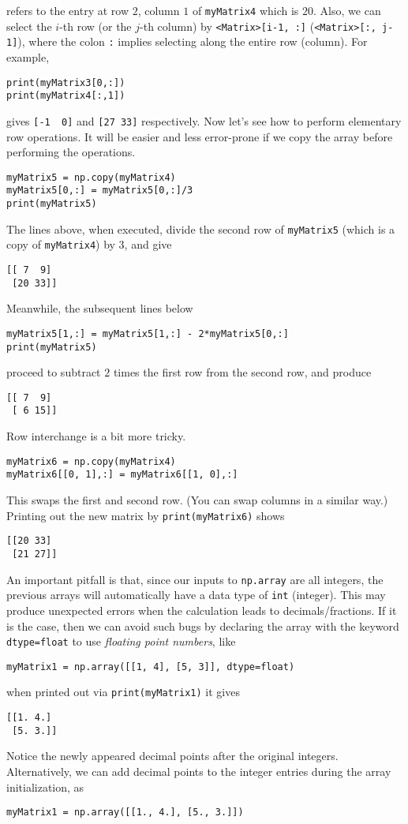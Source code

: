 refers to the entry at row $2$, column $1$ of \verb|myMatrix4| which is $20$. Also, we can select the $i$-th row (or the $j$-th column) by \verb|<Matrix>[i-1, :]| (\verb|<Matrix>[:, j-1]|), where the colon \verb|:| implies selecting along the entire row (column). For example,
\begin{lstlisting}
print(myMatrix3[0,:])
print(myMatrix4[:,1])
\end{lstlisting}
gives
\verb|[-1  0]| and \verb|[27 33]| respectively. Now let's see how to perform elementary row operations. It will be easier and less error-prone if we copy the array before performing the operations.
\begin{lstlisting}
myMatrix5 = np.copy(myMatrix4)
myMatrix5[0,:] = myMatrix5[0,:]/3
print(myMatrix5)
\end{lstlisting}
The lines above, when executed, divide the second row of \verb|myMatrix5| (which is a copy of \verb|myMatrix4|) by $3$, and give
\begin{lstlisting}
[[ 7  9]
 [20 33]]    
\end{lstlisting}
Meanwhile, the subsequent lines below
\begin{lstlisting}
myMatrix5[1,:] = myMatrix5[1,:] - 2*myMatrix5[0,:]
print(myMatrix5)
\end{lstlisting}
proceed to subtract $2$ times the first row from the second row, and produce
\begin{lstlisting}
[[ 7  9]
 [ 6 15]]
\end{lstlisting}
Row interchange is a bit more tricky.
\begin{lstlisting}
myMatrix6 = np.copy(myMatrix4)
myMatrix6[[0, 1],:] = myMatrix6[[1, 0],:]    
\end{lstlisting}
This swaps the first and second row. (You can swap columns in a similar way.) Printing out the new matrix by \verb|print(myMatrix6)| shows
\begin{lstlisting}
[[20 33]
 [21 27]]
\end{lstlisting}
An important pitfall is that, since our inputs to \texttt{np.array} are all integers, the previous arrays will automatically have a data type of \texttt{int} (integer). This may produce unexpected errors when the calculation leads to decimals/fractions. If it is the case, then we can avoid such bugs by declaring the array with the keyword \verb|dtype=float| to use \textit{floating point numbers}, like
\begin{lstlisting}
myMatrix1 = np.array([[1, 4], [5, 3]], dtype=float) 
\end{lstlisting}
when printed out via \verb|print(myMatrix1)| it gives
\begin{lstlisting}
[[1. 4.]
 [5. 3.]]    
\end{lstlisting}
Notice the newly appeared decimal points after the original integers. Alternatively, we can add decimal points to the integer entries during the array initialization, as
\begin{lstlisting}
myMatrix1 = np.array([[1., 4.], [5., 3.]]) 
\end{lstlisting}

